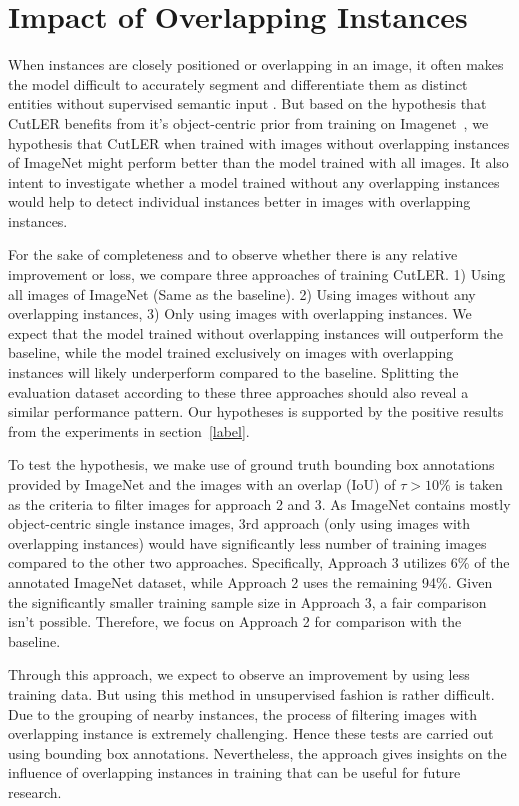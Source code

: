 \section{Impact of Overlapping Instances}
\label{section:analysis_ol_instancs}
When instances are closely positioned or overlapping in an image, it often makes the model difficult to accurately segment and differentiate them as distinct entities without supervised semantic input \cite{kara2022image}. But based on the hypothesis that CutLER benefits from it's object-centric prior from training on Imagenet~\cite{engstler2023understanding}, we hypothesis that CutLER when trained with images without overlapping instances of ImageNet might perform better than the model trained with all images. It also intent to investigate whether a model trained without any overlapping instances would help to detect individual instances better in images with overlapping instances.

For the sake of completeness and to observe whether there is any relative improvement or loss, we compare three approaches of training CutLER. 1) Using all images of ImageNet (Same as the baseline). 2) Using images without any overlapping instances, 3)  Only using images with overlapping instances. We expect that the model trained without overlapping instances will outperform the baseline, while the model trained exclusively on images with overlapping instances will likely underperform compared to the baseline. Splitting the evaluation dataset according to these three approaches should also reveal a similar performance pattern. Our hypotheses is supported by the positive results from the experiments in section~\ref{label}.

To test the hypothesis, we make use of ground truth bounding box annotations provided by ImageNet and the images with an overlap (IoU) of \(\tau > \text{10\%}\) is taken as the criteria to filter images for approach 2 and 3. As ImageNet contains mostly object-centric single instance images, 3rd approach (only using images with overlapping instances) would have significantly less number of training images compared to the other two approaches. Specifically, Approach 3 utilizes 6\% of the annotated ImageNet dataset, while Approach 2 uses the remaining 94\%. Given the significantly smaller training sample size in Approach 3, a fair comparison isn't possible. Therefore, we focus on Approach 2 for comparison with the baseline.

Through this approach, we expect to observe an improvement by using less training data. But using this method in unsupervised fashion is rather difficult. Due to the grouping of nearby instances, the process of filtering images with overlapping instance is extremely challenging. Hence these tests are carried out using bounding box annotations. Nevertheless, the approach gives insights on the influence of overlapping instances in training that can be useful for future research.

